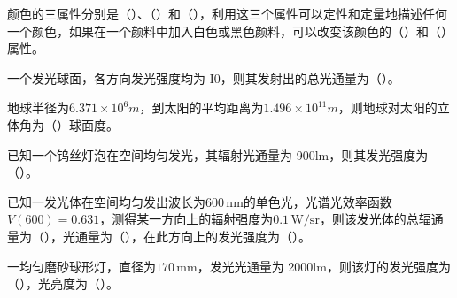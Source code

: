 \documentclass[padl, analysis, notocnum]{ExBook}
\newcommand{\answerarea}[1][3.5cm]{%
  \par\vspace{1mm}%
  \noindent{\color{themeColor!35}\rule{\linewidth}{0.4pt}}\par
  \noindent\begin{minipage}[t][#1][t]{\linewidth}\vspace{0pt}\end{minipage}\par
  \noindent{\color{themeColor!35}\rule{\linewidth}{0.4pt}}\par
}
\begin{document}
\begin{qitems}[startnum=5]
\qitem 颜色的三属性分别是（\hspace{1.6em}）、（\hspace{1.6em}）和（\hspace{1.6em}），利用这三个属性可以定性和定量地描述任何一个颜色，如果在一个颜料中加入白色或黑色颜料，可以改变该颜色的（\hspace{1.6em}）和（\hspace{1.6em}）属性。
\label{q:97:start}
\answerarea[4.0cm]
\label{q:97:end}
\end{qitems}

\begin{qitems}[startnum=6]
\qitem 一个发光球面，各方向发光强度均为 I0，则其发射出的总光通量为（\hspace{1.6em}）。
\label{q:98:start}
\answerarea[4.0cm]
\label{q:98:end}
\end{qitems}

\begin{qitems}[startnum=7]
\qitem 地球半径为$6.371\times 10^{6}m$，到太阳的平均距离为$1.496\times 10^{11}m$，则地球对太阳的立体角为（\hspace{1.6em}）球面度。
\label{q:99:start}
\answerarea[4.0cm]
\label{q:99:end}
\end{qitems}

\begin{qitems}[startnum=8]
\qitem 已知一个钨丝灯泡在空间均匀发光，其辐射光通量为 900lm，则其发光强度为（\hspace{1.6em}）。
\label{q:100:start}
\answerarea[4.0cm]
\label{q:100:end}
\end{qitems}

\begin{qitems}[startnum=9]
\qitem 已知一发光体在空间均匀发出波长为$600\,\mathrm{nm}$的单色光，光谱光效率函数$V(600)=0.631$，测得某一方向上的辐射强度为$0.1\,\mathrm{W/sr}$，则该发光体的总辐通量为（\hspace{1.6em}），光通量为（\hspace{1.6em}），在此方向上的发光强度为（\hspace{1.6em}）。
\label{q:101:start}
\answerarea[4.0cm]
\label{q:101:end}
\end{qitems}

\begin{qitems}[startnum=10]
\qitem 一均匀磨砂球形灯，直径为$170\,\mathrm{mm}$，发光光通量为 2000lm，则该灯的发光强度为（\hspace{1.6em}），光亮度为（\hspace{1.6em}）。
\label{q:102:start}
\answerarea[4.0cm]
\label{q:102:end}
\end{qitems}
\end{document}

